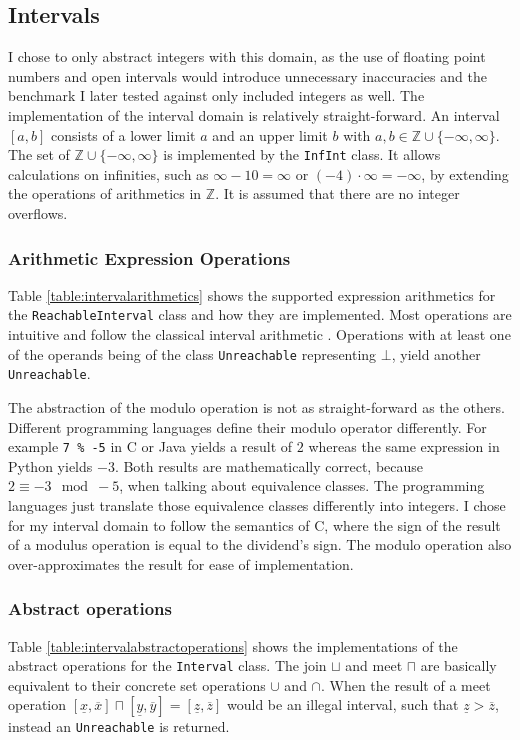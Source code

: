 \subsection{Intervals}
I chose to only abstract integers with this domain, as the use of floating point numbers and open intervals would introduce unnecessary inaccuracies and the benchmark I later tested against only included integers as well. The implementation of the interval domain is relatively straight-forward. An interval $[a,b]$ consists of a lower limit $a$ and an upper limit $b$ with $a,b \in \mathbb{Z}\cup\{-\infty,\infty\}$. The set of $\mathbb{Z}\cup\{-\infty,\infty\}$ is implemented by the \texttt{InfInt} class. It allows calculations on infinities, such as $\infty - 10 = \infty$ or $(-4) \cdot \infty = -\infty$, by extending the operations of arithmetics in $\mathbb{Z}$. It is assumed that there are no integer overflows.

\subsubsection{Arithmetic Expression Operations}
Table \ref{table:intervalarithmetics} shows the supported expression arithmetics for the \texttt{ReachableInterval} class and how they are implemented. Most operations are intuitive and follow the classical interval arithmetic \cite{dawood2011}. Operations with at least one of the operands being of the class \texttt{Unreachable} representing $\bot$, yield another \texttt{Unreachable}. 

The abstraction of the modulo operation is not as straight-forward as the others. Different programming languages define their modulo operator differently. For example \texttt{7 \% -5} in C or Java yields a result of $2$ whereas the same expression in Python yields $-3$. Both results are mathematically correct, because $2 \equiv -3 \mod -5$, when talking about equivalence classes. The programming languages just translate those equivalence classes differently into integers. I chose for my interval domain to follow the semantics of C, where the sign of the result of a modulus operation is equal to the dividend's sign. The modulo operation also over-approximates the result for ease of implementation.



\subsubsection{Abstract operations}
Table \ref{table:intervalabstractoperations} shows the implementations of the abstract operations for the \texttt{Interval} class. The join $\sqcup$ and meet $\sqcap$ are basically equivalent to their concrete set operations $\cup$ and $\cap$. When the result of a meet operation $[\underline{x},\overline{x}] \sqcap [\underline{y},\overline{y}] = [\underline{z},\overline{z}]$ would be an illegal interval, such that 
$\underline{z}>\overline{z}$, instead an \texttt{Unreachable} is returned.

